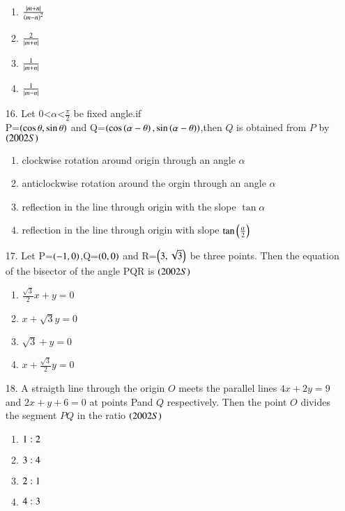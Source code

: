 \documentclass[journal,12pt,onecolumn]{IEEEtran}
\theoremstyle{remark}
\begin{document}
\begin{enumerate}
\begin{enumerate}
     \item $\frac{\left\vert m+n\right\vert}{\left(m-n\right)^2}$
     \item $\frac{2}{\left\vert m+n\right\vert}$
     \item $\frac{1}{\left\vert m+n\right\vert}$
     \item $\frac{1}{\left\vert m-n\right\vert}$
    
\end{enumerate}
\item[16.] Let $0$\textless $\alpha $\textless $\frac{\pi}{2}$ be fixed angle.if\\
P=$\left(\cos\theta,\sin\theta\right)$ and Q=$\left(\cos\left(\alpha-\theta\right),\sin\left(\alpha-\theta\right)\right)$,then $Q$ is obtained from $P$ by
\hfill{$\left(2002S\right)$}
\begin{enumerate}
    \item clockwise rotation around origin through an angle $\alpha$
    \item anticlockwise rotation around the orgin through an angle $\alpha$
    \item reflection in the line through origin with the slope $\tan\alpha$
    \item reflection in the line through origin with slope $\tan\left(\frac{\alpha}{2}\right)$
\end{enumerate}
\item[17.] Let P=$\left(-1,0\right)$,Q=$\left(0,0\right)$ and R=$\left(3,\sqrt{3}\right)$ be three points. Then the equation of the bisector of the angle PQR is 
\hfill{$\left(2002S\right)$}
\begin{enumerate}
    
        \item $\frac{\sqrt{3}}{2}x+y=0$
        \item $x+\sqrt{3}y=0$
        \item $\sqrt{3}+y=0$
        \item $x+\frac{\sqrt{3}}{2}y=0$
    
\end{enumerate}
\item[18.] A straigth line through the origin $O$ meets the parallel lines $4x+2y=9$ and $2x+y+6=0$ at points Pand $Q$ respectively. Then the point $O$ divides the segment $PQ$ in the ratio 
\hfill{$\left(2002S\right)$}
\begin{enumerate}

     \item $1 : 2$
     \item $3 : 4$
     \item $2 : 1$
     \item $4 : 3$

\end{enumerate}
\end{enumerate}
\end{document}

